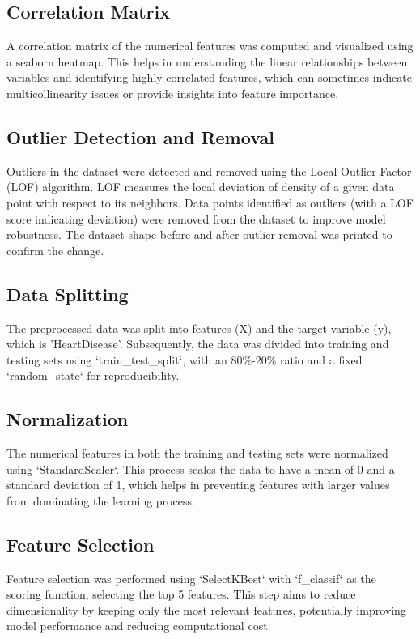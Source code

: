 \documentclass{article}
\begin{document}
\subsection{Correlation Matrix}
A correlation matrix of the numerical features was computed and visualized using a seaborn heatmap. This helps in understanding the linear relationships between variables and identifying highly correlated features, which can sometimes indicate multicollinearity issues or provide insights into feature importance.

\subsection{Outlier Detection and Removal}
Outliers in the dataset were detected and removed using the Local Outlier Factor (LOF) algorithm. LOF measures the local deviation of density of a given data point with respect to its neighbors. Data points identified as outliers (with a LOF score indicating deviation) were removed from the dataset to improve model robustness. The dataset shape before and after outlier removal was printed to confirm the change.

\subsection{Data Splitting}
The preprocessed data was split into features (X) and the target variable (y), which is 'HeartDisease'. Subsequently, the data was divided into training and testing sets using `train_test_split`, with an 80\%-20\% ratio and a fixed `random_state` for reproducibility.

\subsection{Normalization}
The numerical features in both the training and testing sets were normalized using `StandardScaler`. This process scales the data to have a mean of 0 and a standard deviation of 1, which helps in preventing features with larger values from dominating the learning process.

\subsection{Feature Selection}
Feature selection was performed using `SelectKBest` with `f_classif` as the scoring function, selecting the top 5 features. This step aims to reduce dimensionality by keeping only the most relevant features, potentially improving model performance and reducing computational cost.
\end{document}
